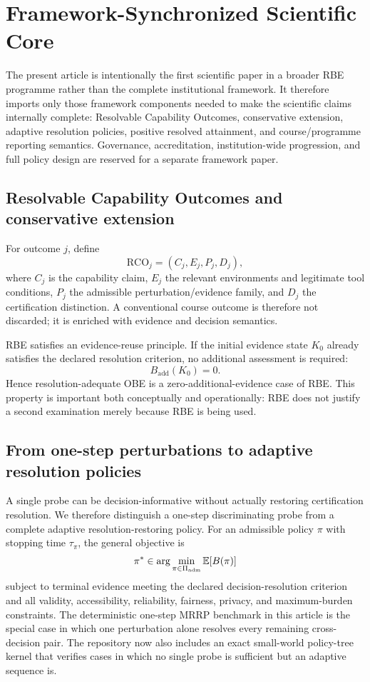 
\section{Framework-Synchronized Scientific Core}
\label{sec:framework-sync-core}

The present article is intentionally the first scientific paper in a broader RBE programme rather than the complete institutional framework. It therefore imports only those framework components needed to make the scientific claims internally complete: Resolvable Capability Outcomes, conservative extension, adaptive resolution policies, positive resolved attainment, and course/programme reporting semantics. Governance, accreditation, institution-wide progression, and full policy design are reserved for a separate framework paper.

\subsection{Resolvable Capability Outcomes and conservative extension}
For outcome $j$, define
\[
\mathrm{RCO}_j=(C_j,E_j,P_j,D_j),
\]
where $C_j$ is the capability claim, $E_j$ the relevant environments and legitimate tool conditions, $P_j$ the admissible perturbation/evidence family, and $D_j$ the certification distinction. A conventional course outcome is therefore not discarded; it is enriched with evidence and decision semantics.

RBE satisfies an evidence-reuse principle. If the initial evidence state $K_0$ already satisfies the declared resolution criterion, no additional assessment is required:
\[
B_{\mathrm{add}}(K_0)=0.
\]
Hence resolution-adequate OBE is a zero-additional-evidence case of RBE. This property is important both conceptually and operationally: RBE does not justify a second examination merely because RBE is being used.

\subsection{From one-step perturbations to adaptive resolution policies}
A single probe can be decision-informative without actually restoring certification resolution. We therefore distinguish a one-step discriminating probe from a complete adaptive resolution-restoring policy. For an admissible policy $\pi$ with stopping time $\tau_\pi$, the general objective is
\[
\pi^*\in\arg\min_{\pi\in\Pi_{\rm adm}}\mathbb{E}[B(\pi)]
\]
subject to terminal evidence meeting the declared decision-resolution criterion and all validity, accessibility, reliability, fairness, privacy, and maximum-burden constraints. The deterministic one-step MRRP benchmark in this article is the special case in which one perturbation alone resolves every remaining cross-decision pair. The repository now also includes an exact small-world policy-tree kernel that verifies cases in which no single probe is sufficient but an adaptive sequence is.

